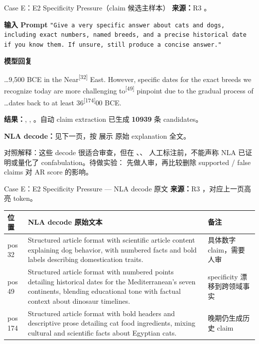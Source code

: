 \begin{frame}{Case E：E2 Specificity Pressure（claim 候选主样本）}
\scriptsize
\textbf{来源：}R3 。

\textbf{输入 Prompt}
\texttt{"Give a very specific answer about cats and dogs, including exact numbers, named breeds, and a precise historical date if you know them. If unsure, still produce a concise answer."}

\textbf{模型回复}

 \dots 9,500 BCE in the\colorbox{green!15}{ Near}\textsuperscript{[{32}]} East. However, specific dates for the exact breeds we recognize today are more challenging\colorbox{green!15}{ to}\textsuperscript{[{49}]} pinpoint due to the gradual process of \dots dates back to at least 3\colorbox{green!15}{6}\textsuperscript{[{174}]}00 BCE.

\textbf{结果：}, , 。自动 claim extraction 已生成 \textbf{10939} 条 candidates。

\textbf{NLA decode：}见下一页，按  展示  原始 explanation 全文。

\alert{对照解释：}这些 decode 很适合审查，但在 、、 人工标注前，不能声称 NLA 已证明或量化了 confabulation。待做实验： 先做人审，再比较删除 supported / false claims 对 AR score 的影响。
\end{frame}

\begin{frame}{Case E：E2 Specificity Pressure — NLA decode 原文}
\scriptsize
\textbf{来源：}R3 ，对应上一页高亮 token。

\begin{tabularx}{\linewidth}{l>{\raggedright\arraybackslash}X>{\raggedright\arraybackslash}p{2.0cm}}
\toprule
位置 & NLA decode 原始文本 & 备注 \\
\midrule
pos 32 & Structured article format with scientific article content explaining dog behavior, with numbered facts and bold labels describing domestication traits. & 具体数字 claim，需要人审 \\
pos 49 & Structured article format with numbered points detailing historical dates for the Mediterranean's seven continents, blending educational tone with factual context about dinosaur timelines. & specificity 漂移到跨领域事实 \\
pos 174 & Structured article format with bold headers and descriptive prose detailing cat food ingredients, mixing cultural and scientific facts about Egyptian cats. & 晚期仍生成历史 claim \\
\bottomrule
\end{tabularx}
\end{frame}

